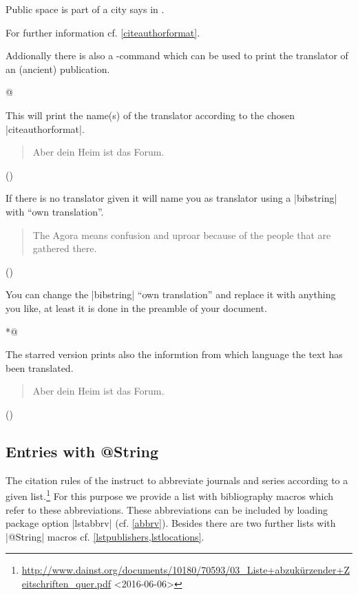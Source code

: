 \documentclass[a4paper,
10pt,
greek,
french,
spanish,
italian,
ngerman,
english
]{ltxdoc}
\begin{document}
\begin{example}
Public space is part of a city says \citeauthor{Osland2016} in .
\end{example}
For further information cf. \cref{citeauthorformat}.

\DescribeMacro{\citetranslator}\label{citetranslator}%
Addionally there is also a -command which can be used to print the translator of an (ancient) publication.
\begin{code}
\citetranslator*@%
\end{code}
This will print the name(s) of the translator according to the chosen |citeauthorformat|.

\begin{example}
\blockcquote[12,25,1]{Cic:Att}{Aber dein Heim ist das Forum.} ()
\end{example}
If there is no translator given it will name you as translator using a |bibstring| with \enquote{own translation}.
\begin{example}
\blockcquote[3,62,1]{Artem}{The Agora means confusion and uproar because of the people that are gathered there.} ()
\end{example}
You can change the |bibstring| \enquote{own translation} and replace it with anything you like, 
at least it is done in the preamble of your document.
\begin{code}
\end{code}



\DescribeMacro{\citetranslator*}
\begin{code}
\citetranslator* *@%
\end{code} 

The starred version prints also the informtion from which language the text has been translated.

\begin{example}
\blockcquote[12,25,1]{Cic:Att}{Aber dein Heim ist das Forum.} ()
\end{example}



\subsection{Entries with @String}\label{string}
The citation rules of the \DAI instruct to abbreviate journals and series according to a given list.\footnote{\url{http://www.dainst.org/documents/10180/70593/03_Liste+abzukürzender+Zeitschriften_quer.pdf} <2016-06-06>}
For this purpose we provide a list with bibliography macros which refer to these abbreviations. 
These abbreviations can be included by loading package option |lstabbrv| (cf. \cref{abbrv}). 
Besides there are two further lists with |@String| macros cf. \cref{lstpublishers,lstlocations}.
\end{document}
